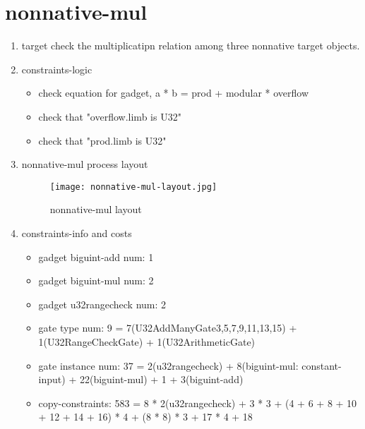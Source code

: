 \section{nonnative-mul}
\label{nonnative-mul}

\begin{enumerate}
    \item target
        check the multiplicatipn relation among three nonnative target objects.
    \item constraints-logic
        \begin{itemize}
            \item check equation for gadget,  a * b = prod + modular * overflow
            \item check that "overflow.limb is U32"
            \item check that "prod.limb is U32"
        \end{itemize}
    \item nonnative-mul process layout
        \begin{figure}[!ht]
            \centering
            \texttt{[image: nonnative-mul-layout.jpg]}
            \caption{nonnative-mul layout}
            \label{fig:nonnative-mul-layout}
        \end{figure}
    
    \item constraints-info and costs
        \begin{itemize}
            \item gadget biguint-add num: 1
            \item gadget biguint-mul num: 2
            \item gadget u32rangecheck num: 2
            \item gate type num: 9 = 7(U32AddManyGate{3,5,7,9,11,13,15}) + 1(U32RangeCheckGate) + 1(U32ArithmeticGate)
            \item gate instance num: 37 = 2(u32rangecheck) + 8(biguint-mul: constant-input) + 22(biguint-mul) + 1 + 3(biguint-add)
            \item copy-constraints: 583 = 8 * 2(u32rangecheck) + 3 * 3 + (4 + 6 + 8 + 10 + 12 + 14 + 16) * 4 + (8 * 8) * 3 + 17 * 4 + 18
        \end{itemize}

\end{enumerate}